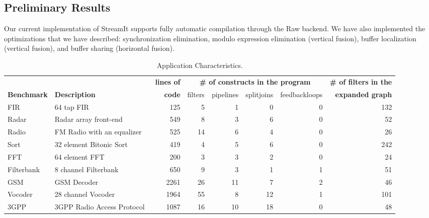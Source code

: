 \subsection{Preliminary Results}
\label{sec:results}

Our current implementation of StreamIt supports fully automatic
compilation through the Raw backend.  We have also implemented the
optimizations that we have described: synchronization elimination,
modulo expression elimination (vertical fusion), buffer localization
(vertical fusion), and buffer sharing (horizontal fusion).

\begin{table*}[htpb]
\begin{center}
\scriptsize
\begin{tabular}{|l|l||r||r|r|r|r||r||} \hline
 & & {\bf lines of} & \multicolumn{4}{|c||}{\bf \# of constructs in the program} & {\bf \# of filters in the} \\ \cline{4-7}
{\bf Benchmark} & {\bf Description} & {\bf code} & filters & pipelines & splitjoins & feedbackloops & {\bf expanded graph}
\\
\hline \hline
FIR & 64 tap FIR & 
125 & 5 & 1 & 0 & 0 & 132
\\ \hline
Radar & Radar array front-end~\cite{pca} & 
549 & 8 & 3 & 6 & 0 & 52
\\ \hline
Radio & FM Radio with an equalizer & 
525 & 14 & 6 & 4 & 0 & 26
\\ \hline
Sort & 32 element Bitonic Sort & 
419 & 4 & 5 & 6 & 0 & 242
\\  \hline
FFT & 64 element FFT & 
200 & 3 & 3 & 2 & 0 & 24
\\  \hline
Filterbank & 8 channel Filterbank & 
650 & 9 & 3 & 1 & 1 & 51
\\  \hline
GSM & GSM Decoder & 
2261 & 26 & 11 & 7 & 2 & 46
\\ \hline
Vocoder & 28 channel Vocoder~\cite{seneff80} &  
1964 & 55 & 8 & 12 & 1 & 101
\\ \hline
3GPP & 3GPP Radio Access Protocol~\cite{3gpp} &  
1087 & 16 & 10 & 18 & 0 & 48
\\ \hline
\hline
\end{tabular}
\vspace{-6pt}
\caption{\protect\small Application Characteristics.}
\label{tab:benchmarks}
\end{center}
\end{table*}


